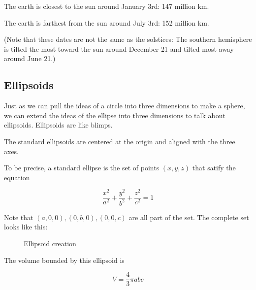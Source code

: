The earth is closest to the sun around January 3rd: 147 million km.

The earth is farthest from the sun around July 3rd: 152 million km.

(Note that these dates are not the same as the solstices: The southern
hemisphere is tilted the most toward the sun around December 21 and
tilted most away around June 21.)

\subsection{Ellipsoids}

Just as we can pull the ideas of a circle into three dimensions to
make a sphere, we can extend the ideas of the ellipse into three
dimensions to talk about ellipsoids. Ellipsoids are like blimps.

The standard ellipsoids are centered at the origin and aligned with the three axes.

\begin{mdframed}[style=important, frametitle={Equation for a Standard Ellipsoid}]

To be precise, a standard ellipse is the set of points $(x, y, z)$ that
satify the equation

$$\frac{x^2}{a^2} + \frac{y^2}{b^2} + \frac{z^2}{c^2}= 1$$


Note that $(a,0,0), (0, b,0), (0,0,c)$ are all part of the
set. The complete set looks like this:
\begin{figure}[htbp]
    \centering
    \caption{Ellipsoid creation}
    \label{fig:ellipsoid}
\end{figure}

  The volume bounded by this ellipsoid is

    $$V = \frac{4}{3} \pi a b c$$


\end{mdframed}

